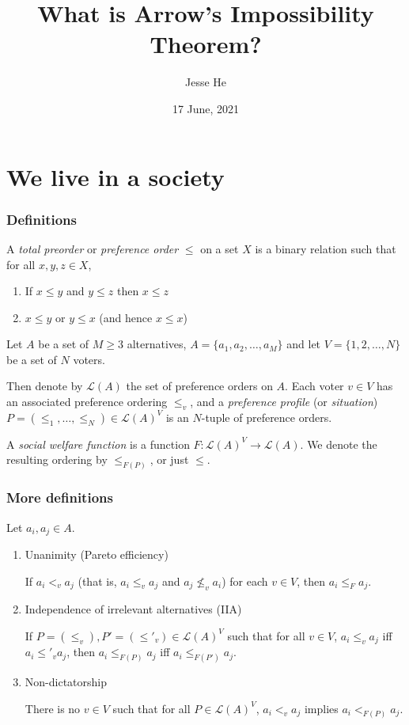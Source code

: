\documentclass{beamer}
\title{What is Arrow's Impossibility Theorem?}
\author{Jesse He}
\institute{OSU What Is?}
\date{17 June, 2021}
\theoremstyle{definition}
\begin{document}
    
\frame{\titlepage}

\section{We live in a society}

\begin{frame}
    \frametitle{Definitions}
    
    \begin{definition}
        A \emph{total preorder} or \emph{preference order} $\leq$ on a set $X$ is a binary relation such that for all $x, y, z \in X$,
        \begin{enumerate}
            \item If $x \leq y$ and $y \leq z$ then $x \leq z$
            \item $x \leq y$ or $y \leq x$ (and hence $x \leq x$)
        \end{enumerate}
    \end{definition}

    \pause
    Let $A$ be a set of $M \geq 3$ alternatives, $A = \{a_1, a_2, \dots, a_M\}$ and let $V = \{1, 2, \dots, N\}$ be a set of $N$ voters.

    \pause
    Then denote by $\mathcal{L}(A)$ the set of preference orders on $A$. Each voter $v \in V$ has an associated preference ordering $\leq_v$,
    and a \emph{preference profile} (or \emph{situation}) $P = (\leq_1, \dots, \leq_N) \in \mathcal{L}(A)^V$ is an $N$-tuple of preference orders.

    \pause
    A \emph{social welfare function} is a function $F : \mathcal{L}(A)^V \to \mathcal{L}(A)$. We denote the resulting ordering by $\leq_{F(P)}$,
    or just $\leq$.
\end{frame}

\begin{frame}
    \frametitle{More definitions}

    Let $a_i, a_j \in A$.

    \begin{enumerate}
        \item Unanimity (Pareto efficiency)
        
        If $a_i <_v a_j$ (that is, $a_i \leq_v a_j$ and $a_j \not\leq_v a_i$) for each $v \in V$, then $a_i \leq_F a_j$.

        \item Independence of irrelevant alternatives (IIA)
        
        If $P = (\leq_v), P' = (\leq'_v) \in \mathcal{L}(A)^V$ such that for all $v \in V$, $a_i \leq_v a_j$
        iff $a_i \leq'_v a_j$, then $a_i \leq_{F(P)} a_j$ iff $a_i \leq_{F(P')} a_j$.

        \item Non-dictatorship
        
        There is no $v \in V$ such that for all $P \in \mathcal{L}(A)^V$, $a_i <_v a_j$ implies $a_i <_{F(P)} a_j$.
    \end{enumerate}

\end{frame}
\end{document}
